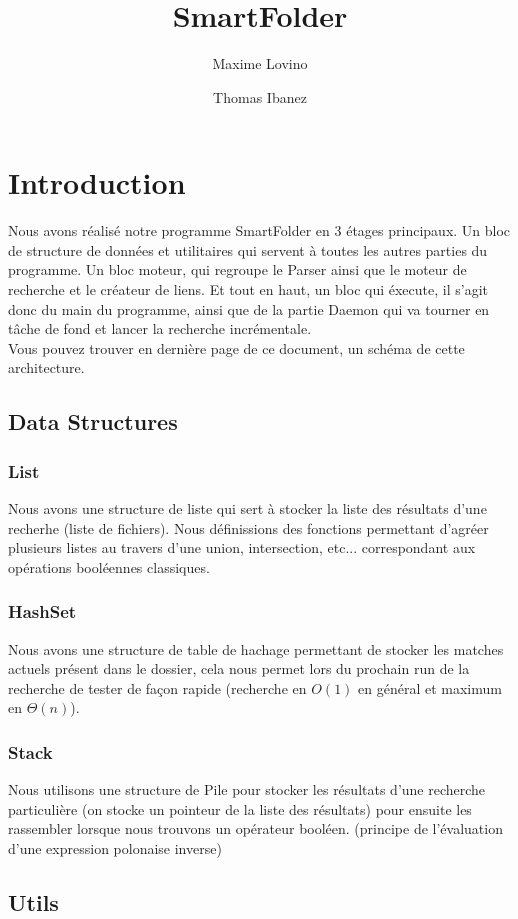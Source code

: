 \documentclass[a4paper]{article}
\title{SmartFolder}
\author{Maxime Lovino \and Thomas Ibanez}
\begin{document}
\maketitle
\newpage
\section{Introduction}
Nous avons réalisé notre programme SmartFolder en 3 étages principaux. Un bloc de structure de données et utilitaires qui servent à toutes les autres parties du programme. Un bloc moteur, qui regroupe le Parser ainsi que le moteur de recherche et le créateur de liens. Et tout en haut, un bloc qui éxecute, il s'agit donc du main du programme, ainsi que de la partie Daemon qui va tourner en tâche de fond et lancer la recherche incrémentale. \\

Vous pouvez trouver en dernière page de ce document, un schéma de cette architecture.
\subsection{Data Structures}
\subsubsection{List}
Nous avons une structure de liste qui sert à stocker la liste des résultats d'une recherhe (liste de fichiers). Nous définissions des fonctions permettant d'agréer plusieurs listes au travers d'une union, intersection, etc... correspondant aux opérations booléennes classiques.
\subsubsection{HashSet}
Nous avons une structure de table de hachage permettant de stocker les matches actuels présent dans le dossier, cela nous permet lors du prochain run de la recherche de tester de façon rapide (recherche en $O(1)$ en général et maximum en $\Theta(n)$).
\subsubsection{Stack}
Nous utilisons une structure de Pile pour stocker les résultats d'une recherche particulière (on stocke un pointeur de la liste des résultats) pour ensuite les rassembler lorsque nous trouvons un opérateur booléen. (principe de l'évaluation d'une expression polonaise inverse)
\newpage
\subsection{Utils}
\end{document}
